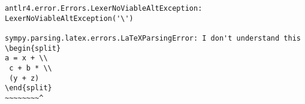 \begin{verbatim}
antlr4.error.Errors.LexerNoViableAltException: LexerNoViableAltException('\')

sympy.parsing.latex.errors.LaTeXParsingError: I don't understand this
\begin{split}
a = x + \\
 c + b * \\
 (y + z)
\end{split}
~~~~~~~~^
\end{verbatim}